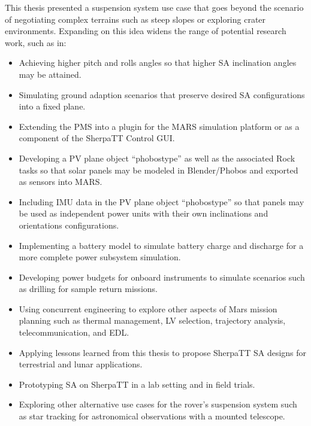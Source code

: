 This thesis presented a suspension system use case that goes beyond the scenario of negotiating complex terrains such as steep slopes or exploring crater environments. Expanding on this idea widens the range of potential research work, such as in:
\begin{itemize}
  \item Achieving higher pitch and rolls angles so that higher \ac{SA} inclination angles may be attained.
  \item Simulating ground adaption scenarios that preserve desired \ac{SA} configurations into a fixed plane.
  \item Extending the \ac{PMS} into a plugin for the MARS simulation platform or as a component of the SherpaTT Control GUI.
  \item Developing a \ac{PV} plane object ``phobostype'' as well as the associated Rock tasks so that solar panels may be modeled in Blender/Phobos and exported as sensors into MARS.   \item Including \ac{IMU} data in the \ac{PV} plane object ``phobostype'' so that panels may be used as independent power units with their own inclinations and orientations configurations.
  \item Implementing a battery model to simulate battery charge and discharge for a more complete power subsystem simulation.
  \item Developing power budgets for onboard instruments to simulate scenarios such as drilling for sample return missions.
  \item Using concurrent engineering to explore other aspects of Mars mission planning such as thermal management, \ac{LV} selection, trajectory analysis, telecommunication, and \ac{EDL}.
  \item Applying lessons learned from this thesis to propose SherpaTT \ac{SA} designs for terrestrial and lunar applications.
  \item Prototyping \ac{SA} on SherpaTT in a lab setting and in field trials.
  \item Exploring other alternative use cases for the rover's suspension system such as star tracking for astronomical observations with a mounted telescope.
\end{itemize}
